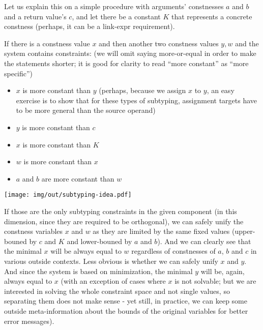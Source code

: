 \begin{ex}
\label{subtyping-idea}

Let us explain this on a simple procedure with arguments' constnesses $a$ and $b$ and a return value's $c$, and let there be a constant $K$ that represents a concrete constness (perhaps, it can be a link-expr requirement).

If there is a constness value $x$ and then another two constness values $y, w$ and the system contains constraints: (we will omit saying more-or-equal in order to make the statements shorter; it is good for clarity to read ``more constant'' as ``more specific'')

\begin{itemize}
    \item $x$ is more constant than $y$ (perhaps, because we assign $x$ to $y$, an easy exercise is to show that for these types of subtyping, assignment targets have to be more general than the source operand)
    \item $y$ is more constant than $c$
    \item $x$ is more constant than $K$
    \item $w$ is more constant than $x$
    \item $a$ and $b$ are more constant than $w$
\end {itemize}

\centerline{\texttt{[image: img/out/subtyping-idea.pdf]}}

If those are the only subtyping constraints in the given component (in this dimension, since they are required to be orthogonal), we can safely unify the constness variables $x$ and $w$ as they are limited by the same fixed values (upper-bouned by $c$ and $K$ and lower-bouned by $a$ and $b$). And we can clearly see that the minimal $x$ will be always equal to $w$ regardless of constnesses of $a$, $b$ and $c$ in various outside contexts. Less obvious is whether we can safely unify $x$ and $y$. And since the system is based on minimization, the minimal $y$ will be, again, always equal to $x$ (with an exception of cases where $x$ is not solvable; but we are interested in solving the whole constraint space and not single values, so separating them does not make sense - yet still, in practice, we can keep some outside meta-information about the bounds of the original variables for better error messages).


\end{ex}
